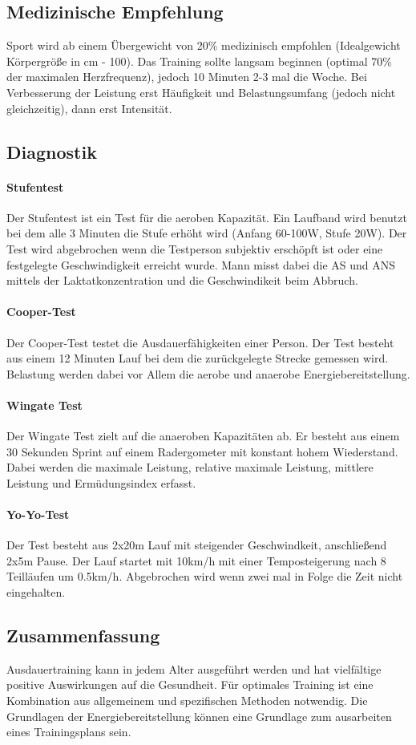 \subsection{Medizinische Empfehlung}
Sport wird ab einem Übergewicht von 20\% medizinisch empfohlen (Idealgewicht Körpergröße in cm - 100).
Das Training sollte langsam beginnen (optimal 70\% der maximalen Herzfrequenz), jedoch 10 Minuten 2-3 mal die Woche.
Bei Verbesserung der Leistung erst Häufigkeit und Belastungsumfang (jedoch nicht gleichzeitig), dann erst Intensität.

\subsection{Diagnostik}
\paragraph{Stufentest}
Der Stufentest ist ein Test für die aeroben Kapazität.
Ein Laufband wird benutzt bei dem alle 3 Minuten die Stufe erhöht wird (Anfang 60-100W, Stufe 20W).
Der Test wird abgebrochen wenn die Testperson subjektiv erschöpft ist oder eine festgelegte Geschwindigkeit erreicht wurde.
Mann misst dabei die AS und ANS mittels der Laktatkonzentration und die Geschwindikeit beim Abbruch.
\paragraph{Cooper-Test}
Der Cooper-Test testet die Ausdauerfähigkeiten einer Person.
Der Test besteht aus einem 12 Minuten Lauf bei dem die zurückgelegte Strecke gemessen wird.
Belastung werden dabei vor Allem die aerobe und anaerobe Energiebereitstellung.
\paragraph{Wingate Test}
Der Wingate Test zielt auf die anaeroben Kapazitäten ab.
Er besteht aus einem 30 Sekunden Sprint auf einem Radergometer mit konstant hohem Wiederstand.
Dabei werden die maximale Leistung, relative maximale Leistung, mittlere Leistung und Ermüdungsindex erfasst.
\paragraph{Yo-Yo-Test}
Der Test besteht aus 2x20m Lauf mit steigender Geschwindkeit, anschließend 2x5m Pause.
Der Lauf startet mit 10km/h mit einer Temposteigerung nach 8 Teilläufen um 0.5km/h.
Abgebrochen wird wenn zwei mal in Folge die Zeit nicht eingehalten.

\subsection{Zusammenfassung}
Ausdauertraining kann in jedem Alter ausgeführt werden und hat vielfältige positive Auswirkungen auf die Gesundheit.
Für optimales Training ist eine Kombination aus allgemeinem und spezifischen Methoden notwendig.
Die Grundlagen der Energiebereitstellung können eine Grundlage zum ausarbeiten eines Trainingsplans sein.
